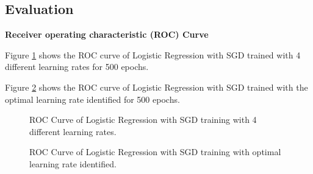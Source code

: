 \documentclass{article} %
\begin{document}
\subsection{Evaluation}

\textbf{Receiver operating characteristic (ROC) Curve}

Figure \ref{Fig8} shows the ROC curve of Logistic Regression with SGD trained with 4 different learning rates for 500 epochs.

Figure \ref{Fig9} shows the ROC curve of Logistic Regression with SGD trained with the optimal learning rate identified for 500 epochs.

\begin{figure}[!htbp]
\begin{center}
\end{center}
\caption{ROC Curve of Logistic Regression with SGD training with 4 different learning rates.}
\label{Fig8}
\end{figure}

\begin{figure}[ht]
\begin{center}
\end{center}
\caption{ROC Curve of Logistic Regression with SGD training with optimal learning rate identified.}
\label{Fig9}
\end{figure}
\end{document}
